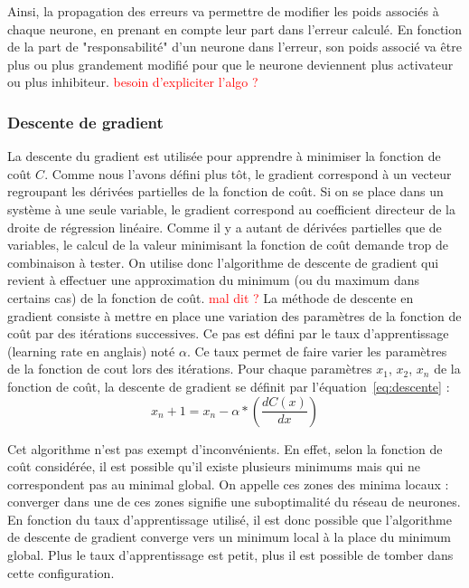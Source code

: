 Ainsi, la propagation des erreurs va permettre de modifier les poids associés à chaque neurone, en prenant en compte leur part dans l'erreur calculé. En fonction de la part de "responsabilité" d'un neurone dans l'erreur, son poids associé va être plus ou plus grandement modifié pour que le neurone deviennent plus activateur ou plus inhibiteur.
\textcolor{red}{besoin d'expliciter l'algo ?}

\subsubsection{Descente de gradient}
La descente du gradient est utilisée pour apprendre à minimiser la fonction de coût $C$. Comme nous l'avons défini plus tôt, le gradient correspond à un vecteur regroupant les dérivées partielles de la fonction de coût. Si on se place dans un système à une seule variable, le gradient correspond au coefficient directeur de la droite de régression linéaire. Comme il y a autant de dérivées partielles que de variables, le calcul de la valeur minimisant la fonction de coût demande trop de combinaison à tester. On utilise donc l'algorithme de descente de gradient qui revient à effectuer une approximation du minimum (ou du maximum dans certains cas) de la fonction de coût. \textcolor{red}{mal dit ?}
La méthode de descente en gradient consiste à mettre en place une variation des paramètres de la fonction de coût par des itérations successives. Ce pas est défini par le taux d'apprentissage (learning rate en anglais) noté $\alpha$. Ce taux permet de faire varier les paramètres de la fonction de cout lors des itérations. Pour chaque paramètres $x_1$, $x_2$, $x_n$ de la fonction de coût, la descente de gradient se définit par l'équation~\ref{eq:descente} :
\begin{equation}
  x_n+1 = x_n - \alpha*(\dfrac{dC(x)}{dx})
  \label{eq:descente}
\end{equation}

Cet algorithme n'est pas exempt d'inconvénients. En effet, selon la fonction de coût considérée, il est possible qu'il existe plusieurs minimums mais qui ne correspondent pas au minimal global. On appelle ces zones des minima locaux : converger dans une de ces zones signifie une suboptimalité du réseau de neurones. En fonction du taux d'apprentissage utilisé, il est donc possible que l'algorithme de descente de gradient converge vers un minimum local à la place du minimum global. Plus le taux d'apprentissage est petit, plus il est possible de tomber dans cette configuration.

